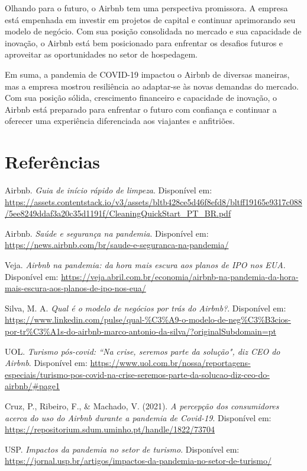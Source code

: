 \documentclass{article}
\begin{document}
Olhando para o futuro, o Airbnb tem uma perspectiva promissora. A empresa está empenhada em investir em projetos de capital e continuar aprimorando seu modelo de negócio. Com sua posição consolidada no mercado e sua capacidade de inovação, o Airbnb está bem posicionado para enfrentar os desafios futuros e aproveitar as oportunidades no setor de hospedagem.

Em suma, a pandemia de COVID-19 impactou o Airbnb de diversas maneiras, mas a empresa mostrou resiliência ao adaptar-se às novas demandas do mercado. Com sua posição sólida, crescimento financeiro e capacidade de inovação, o Airbnb está preparado para enfrentar o futuro com confiança e continuar a oferecer uma experiência diferenciada aos viajantes e anfitriões.
\newpage
\section*{Referências}
Airbnb. \textit{Guia de início rápido de limpeza}. Disponível em: \url{https://assets.contentstack.io/v3/assets/bltb428ce5d46f8efd8/bltff19165e9317c088/5ee8249ddaf3a20c35d1191f/CleaningQuickStart_PT_BR.pdf}

Airbnb. \textit{Saúde e segurança na pandemia}. Disponível em: \url{https://news.airbnb.com/br/saude-e-seguranca-na-pandemia/}

Veja. \textit{Airbnb na pandemia: da hora mais escura aos planos de IPO nos EUA}. Disponível em: \url{https://veja.abril.com.br/economia/airbnb-na-pandemia-da-hora-mais-escura-aos-planos-de-ipo-nos-eua/}

Silva, M. A. \textit{Qual é o modelo de negócios por trás do Airbnb?}. Disponível em: \url{https://www.linkedin.com/pulse/qual-\%C3\%A9-o-modelo-de-neg\%C3\%B3cios-por-tr\%C3\%A1s-do-airbnb-marco-antonio-da-silva/?originalSubdomain=pt}

UOL. \textit{Turismo pós-covid: “Na crise, seremos parte da solução", diz CEO do Airbnb}. Disponível em: \url{https://www.uol.com.br/nossa/reportagens-especiais/turismo-pos-covid-na-crise-seremos-parte-da-solucao-diz-ceo-do-airbnb/#page1}

Cruz, P., Ribeiro, F., & Machado, V. (2021). \textit{A percepção dos consumidores acerca do uso do Airbnb durante a pandemia de Covid-19}. Disponível em: \url{https://repositorium.sdum.uminho.pt/handle/1822/73704}

USP. \textit{Impactos da pandemia no setor de turismo}. Disponível em: \url{https://jornal.usp.br/artigos/impactos-da-pandemia-no-setor-de-turismo/}
\end{document}
